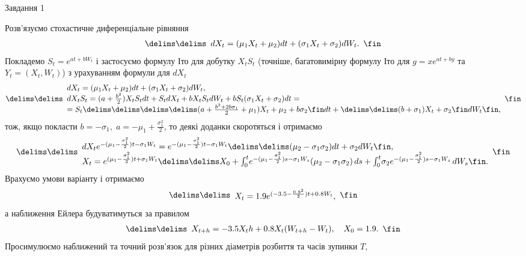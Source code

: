 \documentclass[12pt]{article}
\makeatletter
\def\@bra#1#2\delims#3\fin{\kern-\nulldelimiterspace\left#1#3\right#2\kern-\nulldelimiterspace}
\newcommand\bra[2][()]{\@bra#1\delims#2\fin}
\newcommand\eq[3][..]{\begin{equation*}\bra[#1]{\begin{array}{#2}#3\end{array}}\end{equation*}}
\makeatother
\begin{document}
\centerline{Завдання 1}
Розв'язуємо стохастичне диференціальне рівняння
\eq{c}{dX_t = (\mu_1X_t + \mu_2)dt + (\sigma_1X_t + \sigma_2)dW_t.}
Покладемо $S_t = e^{at + bW_t}$ і застосуємо формулу Іто для добутку $X_tS_t$ (точніше, багатовимірну формулу Іто для $g = xe^{at+by}$ та $Y_t = (X_t, W_t)$) з урахуванням формули для $dX_t$
\eq{l}{
dX_t = (\mu_1X_t + \mu_2)dt + (\sigma_1X_t + \sigma_2)dW_t,\\
dX_tS_t = (a + \frac{b^2}{2})X_tS_tdt + S_tdX_t + bX_tS_tdW_t + bS_t(\sigma_1X_t + \sigma_2)dt =\\
= S_t\bra{\bra{(a + \frac{b^2 + 2b\sigma_1}{2} + \mu_1)X_t + \mu_2 + b\sigma_2}dt + \bra{(b + \sigma_1)X_t + \sigma_2}dW_t},}
тож, якщо покласти $b = -\sigma_1,\;a = -\mu_1 + \frac{\sigma_1^2}{2}$, то деякі доданки скоротяться і отримаємо
\eq{l}{
dX_te^{-(\mu_1 - \frac{\sigma_1^2}{2})t-\sigma_1W_t} = e^{-(\mu_1- \frac{\sigma_1^2}{2})t - \sigma_1W_t}\bra{(\mu_2 - \sigma_1\sigma_2)dt + \sigma_2dW_t},\\
X_t = e^{(\mu_1 - \frac{\sigma_1^2}{2})t + \sigma_1W_t}\bra{X_0 + \int_0^t{\!e^{-(\mu_1 - \frac{\sigma_1^2}{2})s-\sigma_1W_s}(\mu_2 - \sigma_1\sigma_2)\,ds} + \int_0^t{\!\sigma_2e^{-(\mu_1 - \frac{\sigma_1^2}{2})s - \sigma_1W_s}\,dW_s}}.
}
Врахуємо умови варіанту і отримаємо
\eq{c}{X_t = 1.9e^{(-3.5 - \frac{0.8^2}{2})t + 0.8W_t},}
а наближення Ейлера будуватимуться за правилом
\eq{c}{X_{t+h} = -3.5X_th + 0.8X_t(W_{t+h}-W_t),\quad X_0 = 1.9.}
Просимулюємо наближений та точний розв'язок для різних діаметрів розбиття та часів зупинки $T$,
\\
\\
\end{document}

